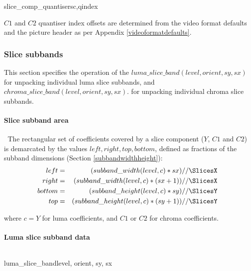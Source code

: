\begin{pseudo}{slice\_comp\_quantisers}{c,qindex}
    \bsEND
\bsEND
\end{pseudo}

$C1$ and $C2$ quantiser index offsets are determined from the video format defaults and the picture header
as per Appendix \ref{videoformatdefaults}.

\subsubsection{Slice subbands}
\label{sliceband}

This section specifies the operation of the $luma\_slice\_band( level,orient,sy,sx)$ for 
unpacking individual luma slice subbands, and $chroma\_slice\_band( level,orient,sy,sx)$. for 
unpacking individual chroma slice subbands.

\paragraph{Slice subband area}
$\ $\newline
The rectangular set of coefficients covered by a slice component ($Y$, $C1$ and $C2$) 
is demarcated by the values $left, right, top, bottom$, defined as fractions
of the subband dimensions (Section \ref{subbandwidthheight}):
\begin{eqnarray*}
  left & = & (subband\_width(level,c)*sx)//\SlicesX \\
  right & = & (subband\_width(level,c)*(sx+1))//\SlicesX \\
  bottom & = & (subband\_height(level,c)*sy)//\SlicesY \\
  top & = & (subband\_height(level,c)*(sy+1))//\SlicesY
\end{eqnarray*}

where $c=Y$ for luma coefficients, and $C1$ or $C2$ for chroma coefficients.

\paragraph{Luma slice subband data}
\label{lumasliceband}
$\ $\newline
\begin{pseudo}{luma\_slice\_band}{level, orient, sy, sx}
  \bsEND
\bsEND
\end{pseudo}

